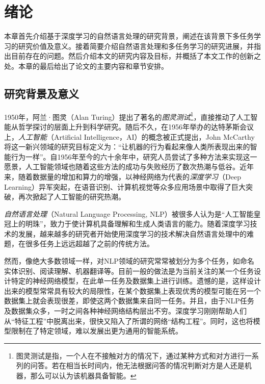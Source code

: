 \chapter{绪论}
\label{cha:intro}
本章首先介绍基于深度学习的自然语言处理的研究背景，阐述在该背景下多任务学习的研究价值及意义。接着简要介绍自然语言处理和多任务学习的研究进展，并指出目前存在的问题。然后介绍本文的研究内容及目标，并概括了本文工作的创新之处。本章的最后给出了论文的主要内容和章节安排。

\section{研究背景及意义}
1950年，阿兰·图灵（Alan Turing）提出了著名的\emph{图灵测试}\footnote{图灵测试是指，一个人在不接触对方的情况下，通过某种方式和对方进行一系列的问答。若在相当长时间内，他无法根据问答的情况判断对方是人还是机器，那么可以认为该机器具备智能。}，直接推动了人工智能从哲学探讨的层面上升到科学研究。随后不久，在1956年举办的达特茅斯会议上，\emph{人工智能}（Artificial Intelligence，AI）的概念被正式提出，John McCarthy将这一新兴领域的研究目标定义为：“让机器的行为看起来像人类所表现出来的智能行为一样”。自1956年至今的六十余年中，研究人员尝试了多种方法来实现这一愿景，人工智能领域也随着这些方法的成功与失败经历了数次热潮与低谷。近年来，随着数据量的增加和算力的增强，以神经网络为代表的\emph{深度学习}（Deep Learning）异军突起，在语音识别\cite{DBLP:conf/asru/MikolovDPBC11}\cite{DBLP:conf/apsipa/LiHYW13}、计算机视觉\cite{DBLP:journals/cacm/KrizhevskySH17}\cite{DBLP:journals/pami/FarabetCNL13}\cite{DBLP:conf/nips/TompsonJLB14}等众多应用场景中取得了巨大突破，再次掀起了人工智能的研究热潮。

\emph{自然语言处理}（Natural Language Processing, NLP）被很多人认为是“人工智能皇冠上的明珠”，致力于使计算机具备理解和生成人类语言的能力。随着深度学习技术的发展，越来越多的研究者开始使用深度学习的技术解决自然语言处理中的难题\cite{DBLP:journals/jmlr/CollobertWBKKK11}\cite{DBLP:conf/emnlp/BordesCW14}\cite{DBLP:conf/acl/JeanCMB15}\cite{DBLP:conf/nips/SutskeverVL14}，在很多任务上远远超越了之前的传统方法。

然而，像绝大多数领域一样，对NLP领域的研究常常被划分为多个任务，如命名实体识别、阅读理解、机器翻译等。目前一般的做法是为当前关注的某一个任务设计特定的神经网络模型，在此单一任务及数据集上进行训练。遗憾的是，这样设计出来的模型常常具有较大的局限性，在某个数据集上表现优秀的模型可能在另一个数据集上就会表现很差，即使这两个数据集来自同一任务。并且，由于NLP任务及数据集众多，一时之间各种神经网络结构层出不穷。深度学习刚刚帮助人们从“特征工程”中脱离出来，很快又陷入了所谓的网络“结构工程”。同时，这也将模型限制在了特定领域，难以发展出更为通用的智能系统。

